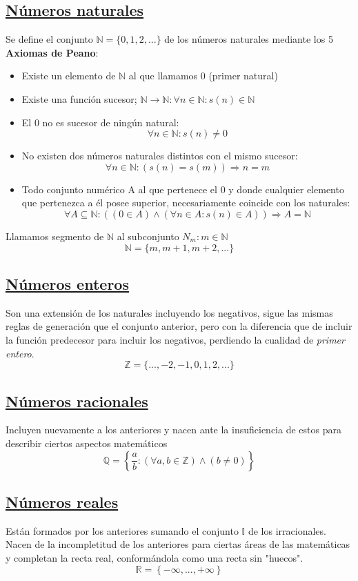 \documentclass[10pt,a4paper,openright]{book}
\begin{document}
\subsection*{\underline {Números naturales}}
Se define el conjunto $\mathbb N=\{0,1,2,...\}$ de los números naturales mediante los 5 \textbf{Axiomas de Peano}:
\begin{itemize}
\item Existe un elemento de $\mathbb N$ al que llamamos 0 (primer natural)
\item Existe una función sucesor; $\mathbb N \rightarrow \mathbb N : \forall n \in \mathbb N: s(n)\in \mathbb N$
\item El 0 no es sucesor de ningún natural:
$$\forall n \in \mathbb N: s(n) \neq 0$$
\item No existen dos números naturales distintos con el mismo sucesor:
$$\forall n \in \mathbb N: \left( s(n)=s(m)\right) \Rightarrow n=m$$
\item Todo conjunto numérico A al que pertenece el 0 y donde cualquier elemento que pertenezca a él posee superior, necesariamente coincide con los naturales:
$$\forall A\subseteq \mathbb N: \left( (0\in A) \wedge (\forall n \in A: s(n)\in A)\right)\Rightarrow A=\mathbb N$$
\end{itemize}
Llamamos segmento de $\mathbb N$ al subconjunto $N_m: m\in \mathbb N$
$$\mathbb N=\{m, m+1,m+2, ...\}$$

\subsection*{\underline{Números enteros}}
Son una extensión de los naturales incluyendo los negativos, sigue las mismas reglas de generación que el conjunto anterior, pero con la diferencia que de incluir la función predecesor para incluir los negativos, perdiendo la cualidad de \textit{primer entero}.
$$\mathbb Z=\{..., -2, -1, 0, 1, 2, ...\}$$

\subsection*{\underline{Números racionales}}
Incluyen nuevamente a los anteriores y nacen ante la insuficiencia de estos para describir ciertos aspectos matemáticos
$$\mathbb Q=\left\lbrace \frac{a}{b}: (\forall a,b \in \mathbb Z) \wedge (b \neq 0) \right\rbrace$$

\subsection*{\underline{Números reales}}
Están formados por los anteriores sumando el conjunto $\mathbb I$ de los irracionales. Nacen de la incompletitud de los anteriores para ciertas áreas de las matemáticas y completan la recta real, conformándola como una recta sin "huecos".
$$\mathbb R=\left\lbrace -\infty, ..., +\infty\right\rbrace$$
\end{document}
